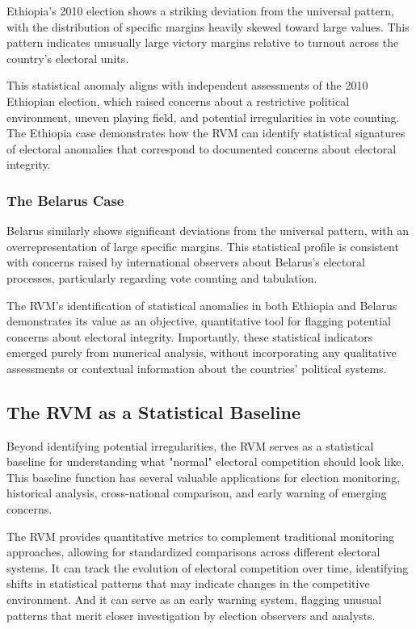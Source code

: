 Ethiopia's 2010 election shows a striking deviation from the universal pattern, with the distribution of specific margins heavily skewed toward large values. This pattern indicates unusually large victory margins relative to turnout across the country's electoral units.

This statistical anomaly aligns with independent assessments of the 2010 Ethiopian election, which raised concerns about a restrictive political environment, uneven playing field, and potential irregularities in vote counting. The Ethiopia case demonstrates how the RVM can identify statistical signatures of electoral anomalies that correspond to documented concerns about electoral integrity.

\subsubsection{The Belarus Case}

Belarus similarly shows significant deviations from the universal pattern, with an overrepresentation of large specific margins. This statistical profile is consistent with concerns raised by international observers about Belarus's electoral processes, particularly regarding vote counting and tabulation.

The RVM's identification of statistical anomalies in both Ethiopia and Belarus demonstrates its value as an objective, quantitative tool for flagging potential concerns about electoral integrity. Importantly, these statistical indicators emerged purely from numerical analysis, without incorporating any qualitative assessments or contextual information about the countries' political systems.

\subsection{The RVM as a Statistical Baseline}

Beyond identifying potential irregularities, the RVM serves as a statistical baseline for understanding what "normal" electoral competition should look like. This baseline function has several valuable applications for election monitoring, historical analysis, cross-national comparison, and early warning of emerging concerns.

The RVM provides quantitative metrics to complement traditional monitoring approaches, allowing for standardized comparisons across different electoral systems. It can track the evolution of electoral competition over time, identifying shifts in statistical patterns that may indicate changes in the competitive environment. And it can serve as an early warning system, flagging unusual patterns that merit closer investigation by election observers and analysts.

